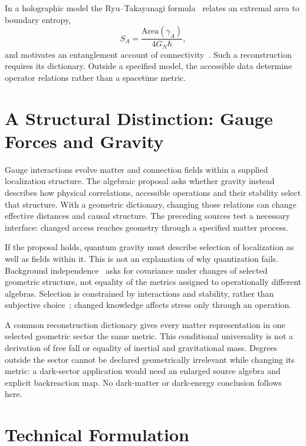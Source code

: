 \documentclass[12pt,a4paper]{article}
\begin{document}
In a holographic model the Ryu--Takayanagi formula~\cite{RyuTakayanagi2006} relates an extremal area to boundary entropy,
\begin{equation}
S_A = \frac{\text{Area}(\gamma_A)}{4 G_N \hbar},
\end{equation}
and motivates an entanglement account of connectivity~\cite{VanRaamsdonk2010}.
Such a reconstruction requires its dictionary. Outside a specified model,
the accessible data determine operator relations rather than a spacetime metric.

\section{A Structural Distinction: Gauge Forces and Gravity}
\label{sec:distinction}

Gauge interactions evolve matter and connection fields within a supplied localization structure. The algebraic proposal asks whether gravity instead describes how physical correlations, accessible operations and their stability select that structure. With a geometric dictionary, changing those relations can change effective distances and causal structure. The preceding sources test a necessary interface: changed access reaches geometry through a specified matter process.

If the proposal holds, quantum gravity must describe selection of localization as well as fields within it. This is not an explanation of why quantization fails. Background independence~\cite{Rovelli2004,Smolin2006} asks for covariance under changes of selected geometric structure, not equality of the metrics assigned to operationally different algebras. Selection is constrained by interactions and stability, rather than subjective choice~\cite{Liu2026PaperB}; changed knowledge affects stress only through an operation.

A common reconstruction dictionary gives every matter representation in one selected geometric sector the same metric. This conditional universality is not a derivation of free fall or equality of inertial and gravitational mass. Degrees outside the sector cannot be declared geometrically irrelevant while changing its metric: a dark-sector application would need an enlarged source algebra and explicit backreaction map. No dark-matter or dark-energy conclusion follows here.

\section{Technical Formulation}
\label{sec:technical}
\end{document}

